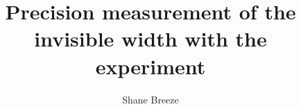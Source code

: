 \documentclass[hyperpdf,bindnopdf]{hepthesis}
\title{Precision measurement of the \PZ invisible width with the \CMS experiment}
\author{Shane Breeze}
\begin{document}
    \begin{frontmatter}
        
        
        
        
        
        
    \end{frontmatter}

    \begin{mainmatter}
        \cleardoublepage
        
        
        
        
        
        
        
        
    \end{mainmatter}

    \begin{appendices}
        
    \end{appendices}

    \begin{backmatter}
        
    \end{backmatter}
\end{document}
